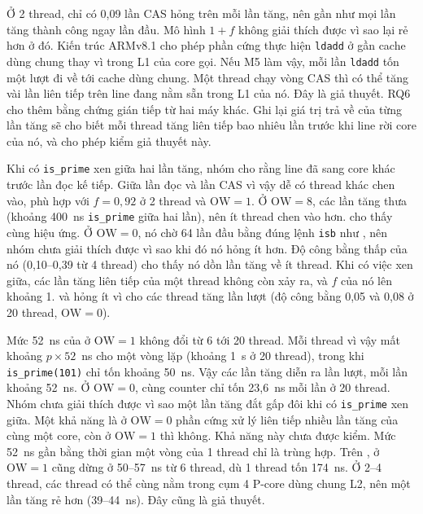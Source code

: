 Ở 2 thread, chỉ có 0,09 lần CAS hỏng trên mỗi lần tăng, nên gần như mọi lần tăng thành công ngay lần đầu.
Mô hình $1+f$ không giải thích được vì sao  lại rẻ hơn  ở đó. Kiến trúc ARMv8.1
cho phép phần cứng thực hiện \texttt{ldadd} ở gần cache dùng chung thay vì trong L1 của core gọi. Nếu M5
làm vậy, mỗi lần \texttt{ldadd} tốn một lượt đi về tới cache dùng chung. Một thread chạy vòng CAS thì có
thể tăng vài lần liên tiếp trên line đang nằm sẵn trong L1 của nó. Đây là giả thuyết. RQ6 cho thêm bằng
chứng gián tiếp từ hai máy khác. Ghi lại giá trị trả về của từng lần tăng sẽ cho biết mỗi thread tăng
liên tiếp bao nhiêu lần trước khi line rời core của nó, và cho phép kiểm giả thuyết này.

Khi có \texttt{is\_prime} xen giữa hai lần tăng, nhóm cho rằng line đã sang core khác trước lần đọc kế
tiếp. Giữa lần đọc và lần CAS vì vậy dễ có thread khác chen vào, phù hợp với $f = 0{,}92$ ở 2 thread và
$\mathrm{OW} = 1$. Ở $\mathrm{OW} = 8$, các lần tăng thưa (khoảng 400~ns \texttt{is\_prime} giữa hai lần),
nên ít thread chen vào hơn.  cho thấy cùng hiệu ứng. Ở $\mathrm{OW} = 0$, nó chờ 64 lần
đầu bằng đúng lệnh \texttt{isb} như , nên nhóm chưa giải thích được vì sao khi đó nó hỏng
ít hơn. Độ công bằng thấp của nó (0,10--0,39 từ 4 thread) cho thấy nó dồn lần tăng về ít thread. Khi có
việc xen giữa, các lần tăng liên tiếp của một thread không còn xảy ra, và $f$ của nó lên khoảng 1.
 và  hỏng ít vì cho các thread tăng lần lượt (độ công bằng 0,05 và
0,08 ở 20 thread, $\mathrm{OW} = 0$).

Mức 52~ns của  ở $\mathrm{OW} = 1$ không đổi từ 6 tới 20 thread. Mỗi thread vì vậy mất
khoảng $p \times 52$~ns cho một vòng lặp (khoảng 1~\textmu s ở 20 thread), trong khi
\texttt{is\_prime(101)} chỉ tốn khoảng 50~ns. Vậy các lần tăng diễn ra lần lượt, mỗi lần khoảng 52~ns. Ở
$\mathrm{OW} = 0$, cùng counter chỉ tốn 23,6~ns mỗi lần ở 20 thread. Nhóm chưa giải thích được vì sao một
lần tăng đắt gấp đôi khi có \texttt{is\_prime} xen giữa. Một khả năng là ở $\mathrm{OW} = 0$ phần cứng xử
lý liên tiếp nhiều lần tăng của cùng một core, còn ở $\mathrm{OW} = 1$ thì không. Khả năng này chưa được
kiểm. Mức 52~ns gần bằng thời gian một vòng của 1 thread chỉ là trùng hợp. Trên ,
 ở $\mathrm{OW} = 1$ cũng dừng ở 50--57~ns từ 6 thread, dù 1 thread tốn 174~ns. Ở 2--4 thread,
các thread có thể cùng nằm trong cụm 4 P-core dùng chung L2, nên một lần tăng rẻ hơn (39--44~ns). Đây cũng
là giả thuyết.

